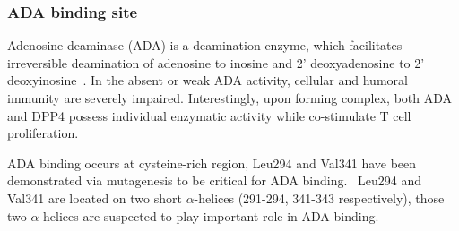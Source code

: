 \subsubsection{ADA binding site}
Adenosine deaminase (ADA) is a deamination enzyme, which facilitates irreversible deamination of adenosine to inosine and 2' deoxyadenosine to 2' deoxyinosine~\cite{Franco_1998}. In the absent or weak ADA activity, cellular and humoral immunity are severely impaired. Interestingly, upon forming complex, both ADA and DPP4 possess individual enzymatic activity while co-stimulate T cell proliferation. 
\par 
ADA binding occurs at cysteine-rich region,
Leu294 and Val341 have been demonstrated via mutagenesis to be critical for ADA binding.~\cite{Abbott_1999} Leu294 and Val341 are located on two short $\alpha$-helices (291-294, 341-343 respectively), those two $\alpha$-helices are suspected to play important role in ADA binding. 